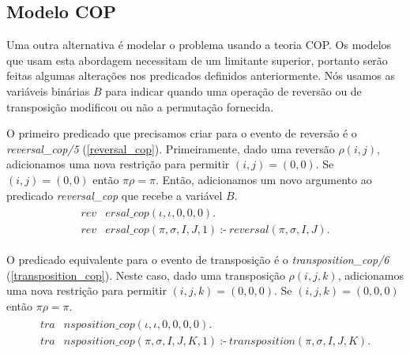 
\subsection{Modelo COP}
\label{subsec:modelcop}
Uma outra alternativa é modelar o problema usando a teoria COP. Os
modelos que usam esta abordagem necessitam de um limitante superior,
portanto serão feitas algumas alterações nos predicados definidos
anteriormente. Nós usamos as variáveis binárias $B$ para indicar
quando uma operação de reversão ou de transposição modificou ou não a
permutação fornecida.

O primeiro predicado que precisamos criar para o evento de reversão é
o \textit{reversal\_cop/5} (\ref{reversal_cop}). Primeiramente, dado
uma reversão $\rho(i, j)$, adicionamos uma nova restrição para
permitir $(i, j) = (0, 0)$. Se $(i, j) = (0, 0)$ então $\pi\rho
= \pi$. Então, adicionamos um novo argumento ao
predicado \textit{reversal\_cop} que recebe a variável $B$.
\begin{align}
  \label{reversal_cop}
  \begin{split}
  \textit{rev}&\textit{ersal\_cop}(\iota, \iota, 0, 0, 0). \\
  \textit{rev}&\textit{ersal\_cop}(\pi, \sigma, I, J, 1)~\text{:-}~ 
  \textit{reversal}(\pi, \sigma, I, J).
  \end{split}
\end{align}

O predicado equivalente para o evento de transposição é
o \textit{transposition\_cop/6} (\ref{transposition_cop}). Neste caso,
dado uma transposição $\rho(i, j, k)$, adicionamos uma nova restrição
para permitir $(i, j, k) = (0, 0, 0)$. Se $(i, j, k) = (0, 0, 0)$
então $\pi\rho = \pi$.
\begin{align}
  \label{transposition_cop}
  \begin{split}
  \textit{tra}&\textit{nsposition\_cop}(\iota, \iota, 0, 0, 0, 0). \\
  \textit{tra}&\textit{nsposition\_cop}(\pi, \sigma, I, J, K, 1)~\text{:-}~ 
  \textit{transposition}(\pi, \sigma, I, J, K). 
  \end{split}
\end{align}

